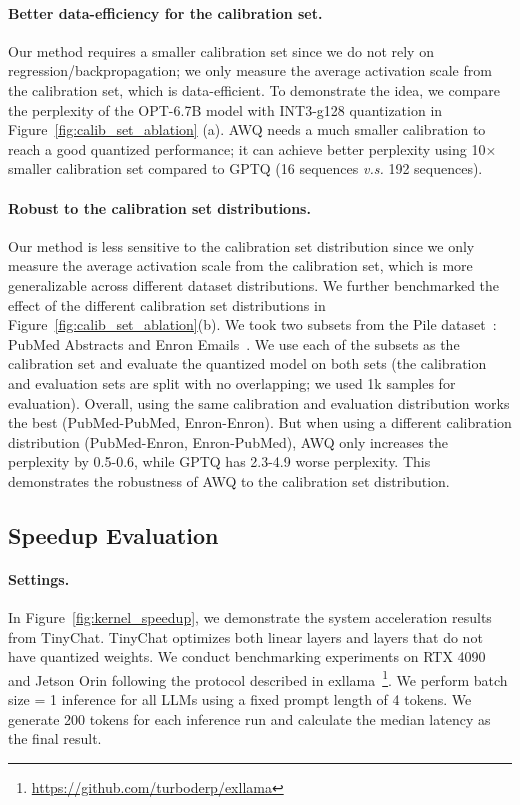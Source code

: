 \paragraph{Better data-efficiency for the calibration set.} Our method requires a smaller calibration set since we do not rely on regression/backpropagation; we only measure the average activation scale from the calibration set, which is data-efficient. To demonstrate the idea, we compare the perplexity of the OPT-6.7B model with INT3-g128 quantization in Figure~\ref{fig:calib_set_ablation} (a). AWQ needs a much smaller calibration to reach a good quantized performance; it can achieve better perplexity using 10$\times$ smaller calibration set compared to GPTQ (16 sequences \emph{v.s.} 192 sequences).

\paragraph{Robust to the calibration set distributions. } Our method is less sensitive to the calibration set distribution since we only measure the average activation scale from the calibration set, which is more generalizable across different dataset distributions. We further benchmarked the effect of the different calibration set distributions in Figure~\ref{fig:calib_set_ablation}(b). We took two subsets from the Pile dataset~\cite{gao2020pile}: PubMed Abstracts and Enron Emails~\cite{klimt2004enron}. We use each of the subsets as the calibration set and evaluate the quantized model on both sets (the calibration and evaluation sets are split with no overlapping; we used 1k samples for evaluation). Overall, using the same calibration and evaluation distribution works the best (PubMed-PubMed, Enron-Enron). But when using a different calibration distribution (PubMed-Enron, Enron-PubMed), AWQ only increases the perplexity by 0.5-0.6, while GPTQ has 2.3-4.9 worse perplexity. This demonstrates the robustness of AWQ to the calibration set distribution. 

\subsection{Speedup Evaluation}

\paragraph{Settings.} In Figure~\ref{fig:kernel_speedup}, we demonstrate the system acceleration results from TinyChat. TinyChat optimizes both linear layers and layers that do not have quantized weights. We conduct benchmarking experiments on RTX 4090 and Jetson Orin following the protocol described in exllama~\footnote{\url{https://github.com/turboderp/exllama}}. We perform batch size = 1 inference for all LLMs using a fixed prompt length of 4 tokens. We generate 200 tokens for each inference run and calculate the median latency as the final result.

